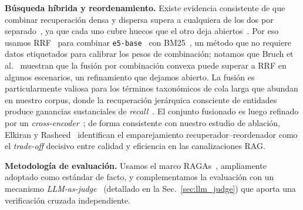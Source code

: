 \documentclass[runningheads]{llncs}
\begin{document}
\textbf{B\'{u}squeda h\'{i}brida y reordenamiento.} Existe evidencia consistente de que combinar recuperaci\'{o}n densa y dispersa supera a cualquiera de los dos por separado~\cite{karpukhin2020dense}, ya que cada uno cubre huecos que el otro deja abiertos~\cite{sinha2026lexicalsemantic}. Por eso usamos RRF~\cite{cormack2009rrf} para combinar \texttt{e5-base}~\cite{wang2024e5} con BM25~\cite{robertson2009bm25}, un m\'{e}todo que no requiere datos etiquetados para calibrar los pesos de combinaci\'{o}n; notamos que Bruch et al.~\cite{bruch2023fusion} muestran que la fusi\'{o}n por combinaci\'{o}n convexa puede superar a RRF en algunos escenarios, un refinamiento que dejamos abierto. La fusi\'{o}n es particularmente valiosa para los t\'{e}rminos taxon\'{o}micos de cola larga que abundan en nuestro corpus, donde la recuperaci\'{o}n jer\'{a}rquica consciente de entidades produce ganancias sustanciales de \emph{recall}~\cite{peng2026hce}. El conjunto fusionado es luego refinado por un \emph{cross-encoder}~\cite{nogueira2019passage}; de forma consistente con nuestro estudio de ablaci\'{o}n, Elkiran y Rasheed~\cite{elkiran2026rerankerpairings} identifican el emparejamiento recuperador--reordenador como el \emph{trade-off} decisivo entre calidad y eficiencia en las canalizaciones RAG.

\textbf{Metodolog\'{i}a de evaluaci\'{o}n.} Usamos el marco RAGAs~\cite{es2023ragas}, ampliamente adoptado como est\'{a}ndar de facto, y complementamos la evaluaci\'{o}n con un mecanismo \emph{LLM-as-judge}~\cite{zheng2023mtbench} (detallado en la Sec.~\ref{sec:llm_judge}) que aporta una verificaci\'{o}n cruzada independiente.
\end{document}
